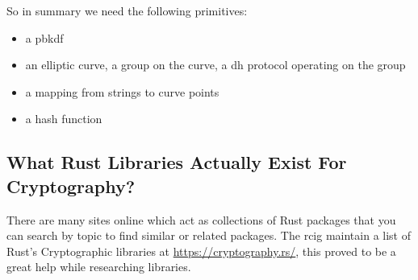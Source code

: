 So in summary we need the following primitives:
\begin{itemize}
  \item{a \gls{pbkdf}}
  \item{an elliptic curve, a group on the curve, a \gls{dh} protocol operating on the group}
  \item{a mapping from strings to curve points}
  \item{a hash function}
\end{itemize}

\subsection{What Rust Libraries Actually Exist For Cryptography?}
There are many sites online which act as collections of Rust packages that you can search by topic to find similar or related packages.
The \gls{rcig} maintain a list of Rust's Cryptographic libraries at \url{https://cryptography.rs/}, this proved to be a great help while researching libraries.


